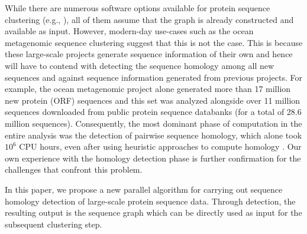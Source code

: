 \documentclass[10pt,journal,letterpaper,compsoc]{IEEEtran}
\begin{document}
While there are numerous software options available for protein sequence clustering (e.g., \cite{Apweiler04,Bateman04,Enright02,Kriventseva01,Olman07}), all of them assume that the graph is already constructed and available as input. However, modern-day use-cases such as the ocean metagenomic sequence clustering suggest that this is not the case. This is because these large-scale projects generate sequence information of their own and hence will have to contend with detecting the sequence homology among all new sequences and against sequence information generated from previous projects. For example, the ocean metagenomic project alone generated more than 17 million new protein (ORF) sequences and this set was analyzed alongside over 11 million  sequences downloaded from public protein sequence databanks (for a total of 28.6 million sequences). Consequently, the most dominant phase of computation in the entire analysis was the detection of pairwise sequence homology, which alone took $10^6$ CPU hours, even after using heuristic approaches to compute homology \cite{Yooseph07}. Our own experience with the homology detection phase \cite{Wu08} is further confirmation for the challenges that confront this problem.

In this paper, we propose a new parallel algorithm for carrying out sequence homology detection of 
large-scale protein sequence data. Through detection, the resulting output is the sequence graph which can be directly used as input for the subsequent clustering step.
\end{document}
